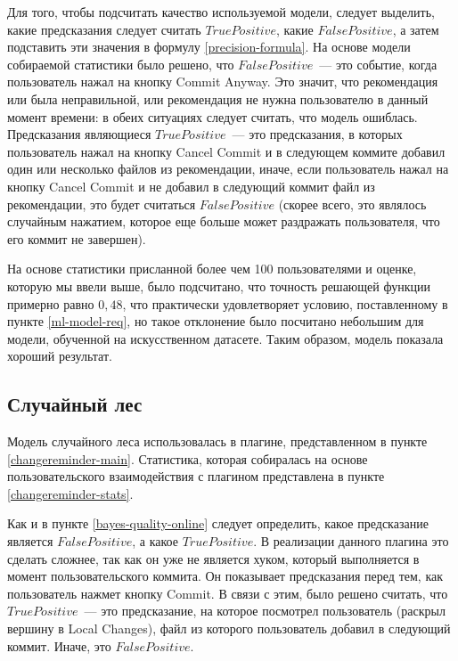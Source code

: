 Для того, чтобы подсчитать качество используемой модели, следует выделить, какие предсказания следует считать $TruePositive$, какие $FalsePositive$, а затем подставить эти значения в формулу \ref{precision-formula}. На основе модели собираемой статистики было решено, что $FalsePositive$~--- это событие, когда пользователь нажал на кнопку Commit Anyway. Это значит, что рекомендация или была неправильной, или рекомендация не нужна пользователю в данный момент времени: в обеих ситуациях следует считать, что модель ошиблась. Предсказания являющиеся $TruePositive$~--- это предсказания, в которых пользователь нажал на кнопку Cancel Commit и в следующем коммите добавил один или несколько файлов из рекомендации, иначе, если пользователь нажал на кнопку Cancel Commit и не добавил в следующий коммит файл из рекомендации, это будет считаться $FalsePositive$ (скорее всего, это являлось случайным нажатием, которое еще больше может раздражать пользователя, что его коммит не завершен).

На основе статистики присланной более чем 100 пользователями и оценке, которую мы ввели выше, было подсчитано, что точность решающей функции примерно равно $0,48$, что практически удовлетворяет условию, поставленному в пункте \ref{ml-model-req}, но такое отклонение было посчитано небольшим для модели, обученной на искусственном датасете. Таким образом, модель показала хороший результат.
    \subsection{Случайный лес}\label{forest-quality-online}
Модель случайного леса использовалась в плагине, представленном в пункте \ref{changereminder-main}. Статистика, которая собиралась на основе пользовательского взаимодействия с плагином представлена в пункте \ref{changereminder-stats}.

Как и в пункте \ref{bayes-quality-online} следует определить, какое предсказание является $FalsePositive$, а какое $TruePositive$. В реализации данного плагина это сделать сложнее, так как он уже не является хуком, который выполняется в момент пользовательского коммита. Он показывает предсказания перед тем, как пользователь нажмет кнопку Commit. В связи с этим, было решено считать, что $TruePositive$~--- это предсказание, на которое посмотрел пользователь (раскрыл вершину в Local Changes), файл из которого пользователь добавил в следующий коммит. Иначе, это $FalsePositive$. 

